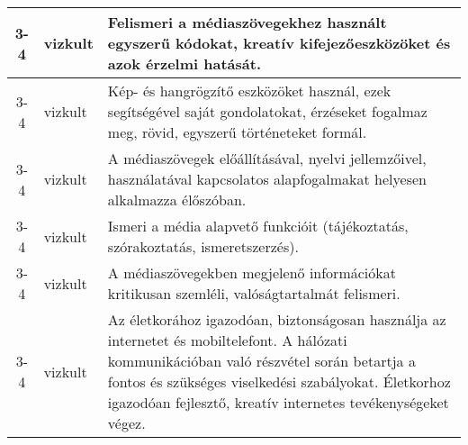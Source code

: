 \begin{small}
\begin{longtable}{c | p{2cm} |  p{11cm} }
              3-4 & vizkult & Felismeri a médiaszövegekhez használt egyszerű kódokat, kreatív kifejezőeszközöket és azok érzelmi hatását. \\ \hline
              3-4 & vizkult & Kép- és hangrögzítő eszközöket használ, ezek segítségével saját gondolatokat, érzéseket fogalmaz meg, rövid, egyszerű történeteket formál. \\ \hline
              3-4 & vizkult & A médiaszövegek előállításával, nyelvi jellemzőivel, használatával kapcsolatos alapfogalmakat  helyesen alkalmazza élőszóban. \\ \hline
              3-4 & vizkult & Ismeri a média alapvető funkcióit (tájékoztatás, szórakoztatás, ismeretszerzés). \\ \hline
              3-4 & vizkult & A médiaszövegekben megjelenő információkat kritikusan szemléli,  valóságtartalmát felismeri. \\ \hline
              3-4 & vizkult & Az életkorához igazodóan,  biztonságosan használja az internetet és mobiltelefont.  A hálózati kommunikációban való részvétel során betartja a fontos és szükséges viselkedési szabályokat. Életkorhoz igazodóan fejlesztő, kreatív internetes tevékenységeket végez. \\ \hline
      \end{longtable}
\end{small}


